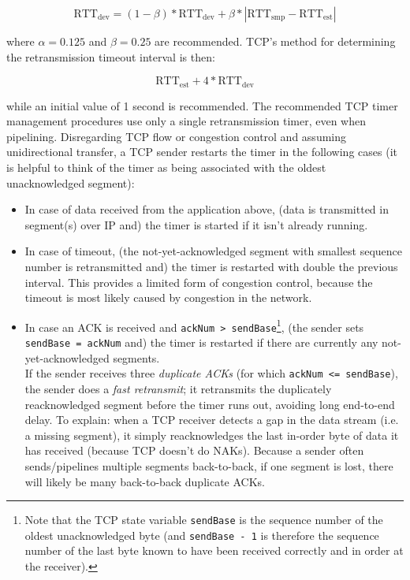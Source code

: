 \documentclass[table, xcdraw]{article}%
\begin{document}
\begin{equation}
    \text{RTT}_\text{dev} = (1 - \beta) * \text{RTT}_\text{dev} + \beta * |\text{RTT}_\text{smp} - \text{RTT}_\text{est}|
\end{equation}

where $\alpha = 0.125$ and $\beta = 0.25$ are recommended. TCP’s method for determining the retransmission
timeout interval is then:

\begin{equation}
    \text{RTT}_\text{est} + 4 * \text{RTT}_\text{dev}
\end{equation}

while an initial value of 1 second is recommended. The recommended TCP timer management procedures use only a single retransmission timer, even when pipelining. Disregarding TCP flow or congestion control and assuming unidirectional transfer, a TCP sender restarts the timer in the following cases (it is helpful to think of the timer as being associated with the oldest unacknowledged segment):

\begin{itemize}
    \item In case of data received from the application above, (data is transmitted in segment(s) over IP and) the timer is started if it isn't already running.
    \item In case of timeout, (the not-yet-acknowledged segment with smallest sequence number is retransmitted and) the timer is restarted with double the previous interval. This provides a limited form of congestion control, because the timeout is most likely caused by congestion in the network.
    \item In case an ACK is received and \texttt{ackNum > sendBase}\footnote{Note that the TCP state variable \texttt{sendBase} is the sequence number of the oldest unacknowledged byte (and \texttt{sendBase - 1} is therefore the sequence number of the last byte known to have been received correctly and in order at the receiver).}, (the sender sets \texttt{sendBase = ackNum} and) the timer is restarted if there are currently any not-yet-acknowledged segments.\\
    If the sender receives three \emph{duplicate ACKs} (for which \texttt{ackNum <= sendBase}), the sender does a \emph{fast retransmit}; it retransmits the duplicately reacknowledged segment before the timer runs out, avoiding long end-to-end delay. To explain: when a TCP receiver detects a gap in the data stream (i.e. a missing segment), it simply reacknowledges the last in-order byte of data it has received (because TCP doesn't do NAKs). Because a sender often sends/pipelines multiple segments back-to-back, if one segment is lost, there will likely be many back-to-back duplicate ACKs.
\end{itemize}
\end{document}
